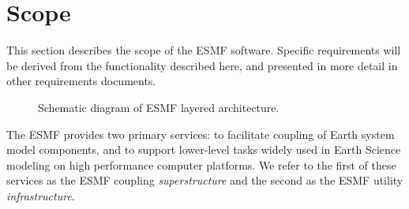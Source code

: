 \section{Scope}
\label{sec:scope}

This section describes the scope of the ESMF software. Specific
requirements will be derived from the functionality described here,
and presented in more detail in other requirements documents.

\begin{figure}
  \begin{center}
    \caption{Schematic diagram of ESMF layered architecture.}
    \label{fig:schematic}
  \end{center}
\end{figure}

The ESMF provides two primary services: to facilitate coupling of
Earth system model components, and to support lower-level tasks widely
used in Earth Science modeling on high performance computer platforms.
We refer to the first of these services as the ESMF coupling {\it
  superstructure} and the second
as the ESMF utility {\it infrastructure}.\\

